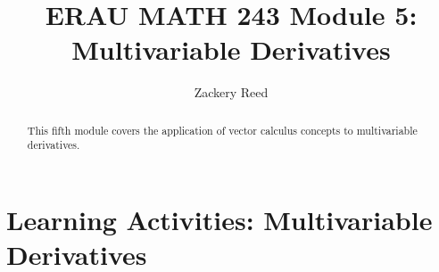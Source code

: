 \documentclass{xourse}
\title{ERAU MATH 243 Module 5: Multivariable Derivatives}
\author{Zackery Reed}
\begin{document}
\begin{abstract}
This fifth module covers the application of vector calculus concepts to multivariable derivatives.
\end{abstract}
\maketitle

\part{Learning Activities: Multivariable Derivatives}
\sectionstyle


\end{document}
